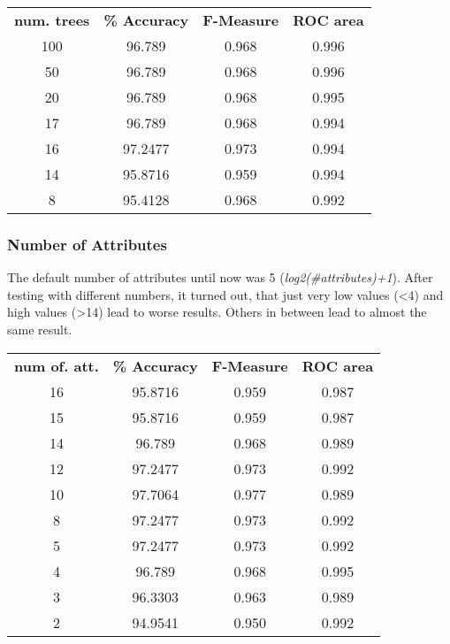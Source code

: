 \documentclass{article}
\begin{document}
\begin{center}
\begin{tabular}{ c | c | c | c }
\textbf{num. trees} & \textbf{\% Accuracy} & \textbf{F-Measure} & \textbf{ROC area} \\
100 & 96.789 & 0.968 & 0.996 \\
50 & 96.789 & 0.968 &  0.996 \\
20 & 96.789 & 0.968 & 0.995 \\
17 & 96.789 & 0.968 & 0.994 \\
16 & 97.2477 & 0.973 & 0.994 \\
14 & 95.8716 & 0.959 & 0.994 \\
8 & 95.4128 & 0.968 & 0.992 \\
\end{tabular}
\end{center}
 
\subsubsection{Number of Attributes}
 
The default number of attributes until now was 5 (\emph{log2(\#attributes)+1}). After testing with different numbers, it turned out, that just very low values (\textless4) and high values (\textgreater14) lead to worse results. Others in between lead to almost the same result.
 
\begin{center}
\begin{tabular}{ c | c | c | c }
\textbf{num of. att.} & \textbf{\% Accuracy} & \textbf{F-Measure} & \textbf{ROC area}\\
16 & 95.8716 & 0.959 & 0.987  \\
15 & 95.8716 & 0.959 & 0.987 \\
14 & 96.789 &  0.968 & 0.989 \\
12 & 97.2477 & 0.973 & 0.992 \\
10 & 97.7064 & 0.977 & 0.989 \\
8 & 97.2477 & 0.973 & 0.992 \\
5 & 97.2477 & 0.973 & 0.992 \\
4 & 96.789 & 0.968 & 0.995 \\
3 & 96.3303 & 0.963 & 0.989 \\
2 & 94.9541 & 0.950 & 0.992 \\
\end{tabular}
\end{center} 
\end{document}
